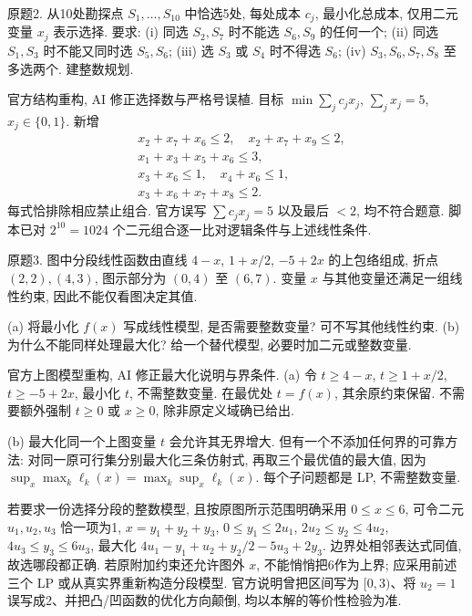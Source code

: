 \begin{exercise}\label{ass:15053-rec6-q2}
原题2. 从10处勘探点 $S_1,\ldots,S_{10}$ 中恰选5处, 每处成本 $c_j$, 最小化总成本, 仅用二元变量 $x_j$ 表示选择. 要求: (i) 同选 $S_2,S_7$ 时不能选 $S_6,S_9$ 的任何一个; (ii) 同选 $S_1,S_3$ 时不能又同时选 $S_5,S_6$; (iii) 选 $S_3$ 或 $S_4$ 时不得选 $S_6$; (iv) $S_3,S_6,S_7,S_8$ 至多选两个. 建整数规划.
\end{exercise}
\begin{solution}
官方结构重构, AI 修正选择数与严格号误植. 目标 $\min\sum_jc_jx_j$, $\sum_jx_j=5$, $x_j\in\{0,1\}$. 新增
\[
\begin{aligned}
&x_2+x_7+x_6\le2,\quad x_2+x_7+x_9\le2,\\
&x_1+x_3+x_5+x_6\le3,\\
&x_3+x_6\le1,\quad x_4+x_6\le1,\\
&x_3+x_6+x_7+x_8\le2.
\end{aligned}
\]
每式恰排除相应禁止组合. 官方误写 $\sum c_jx_j=5$ 以及最后 $<2$, 均不符合题意. 脚本已对 $2^{10}=1024$ 个二元组合逐一比对逻辑条件与上述线性条件.
\end{solution}

\begin{exercise}\label{ass:15053-rec6-q3}
原题3. 图中分段线性函数由直线 $4-x$, $1+x/2$, $-5+2x$ 的上包络组成, 折点 $(2,2),(4,3)$, 图示部分为 $(0,4)$ 至 $(6,7)$. 变量 $x$ 与其他变量还满足一组线性约束, 因此不能仅看图决定其值.
\begin{center}\end{center}
(a) 将最小化 $f(x)$ 写成线性模型, 是否需要整数变量? 可不写其他线性约束. (b) 为什么不能同样处理最大化? 给一个替代模型, 必要时加二元或整数变量.
\end{exercise}
\begin{solution}
官方上图模型重构, AI 修正最大化说明与界条件. (a) 令 $t\ge4-x$, $t\ge1+x/2$, $t\ge-5+2x$, 最小化 $t$, 不需整数变量. 在最优处 $t=f(x)$, 其余原约束保留. 不需要额外强制 $t\ge0$ 或 $x\ge0$, 除非原定义域确已给出.

(b) 最大化同一个上图变量 $t$ 会允许其无界增大. 但有一个不添加任何界的可靠方法: 对同一原可行集分别最大化三条仿射式, 再取三个最优值的最大值, 因为 $\sup_x\max_k\ell_k(x)=\max_k\sup_x\ell_k(x)$. 每个子问题都是 LP, 不需整数变量.

若要求一份选择分段的整数模型, 且按原图所示范围明确采用 $0\le x\le6$, 可令二元 $u_1,u_2,u_3$ 恰一项为1, $x=y_1+y_2+y_3$, $0\le y_1\le2u_1$, $2u_2\le y_2\le4u_2$, $4u_3\le y_3\le6u_3$, 最大化 $4u_1-y_1+u_2+y_2/2-5u_3+2y_3$. 边界处相邻表达式同值, 故选哪段都正确. 若原附加约束还允许图外 $x$, 不能悄悄把6作为上界; 应采用前述三个 LP 或从真实界重新构造分段模型. 官方说明曾把区间写为 $[0,3)$、将 $u_2=1$ 误写成2、并把凸/凹函数的优化方向颠倒, 均以本解的等价性检验为准.
\end{solution}

